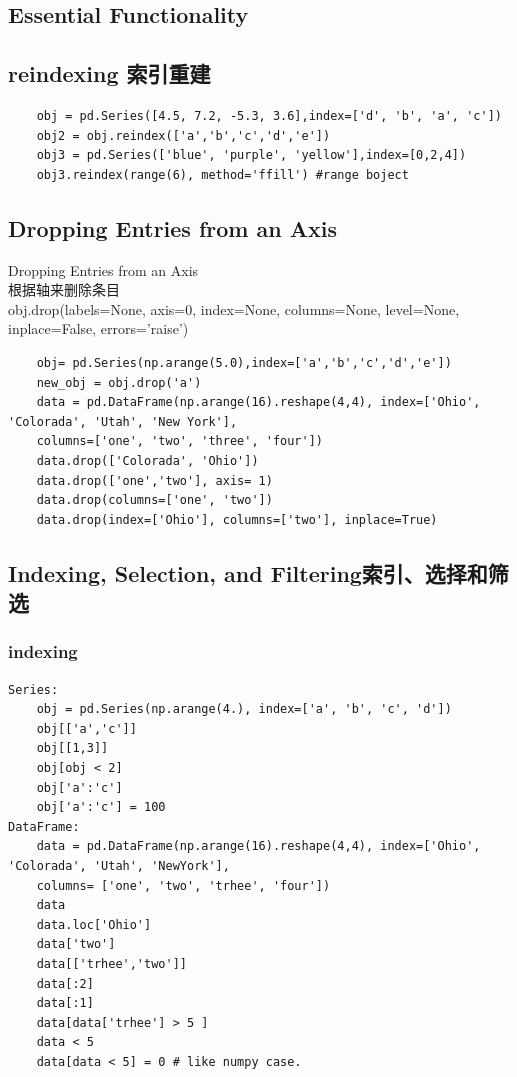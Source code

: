 \documentclass{article}
\begin{document}
\subsection{Essential Functionality}
\subsection{reindexing 索引重建}
\begin{lstlisting}
	obj = pd.Series([4.5, 7.2, -5.3, 3.6],index=['d', 'b', 'a', 'c'])
	obj2 = obj.reindex(['a','b','c','d','e'])
	obj3 = pd.Series(['blue', 'purple', 'yellow'],index=[0,2,4])
	obj3.reindex(range(6), method='ffill') #range boject	
\end{lstlisting}

\subsection{Dropping Entries from an Axis}
\noindent Dropping Entries from an Axis\\
根据轴来删除条目\\
obj.drop(labels=None, axis=0, index=None, columns=None, level=None,\\ inplace=False, errors='raise')\\
\begin{lstlisting}
	obj= pd.Series(np.arange(5.0),index=['a','b','c','d','e'])
	new_obj = obj.drop('a')
	data = pd.DataFrame(np.arange(16).reshape(4,4), index=['Ohio', 'Colorada', 'Utah', 'New York'],
	columns=['one', 'two', 'three', 'four'])
	data.drop(['Colorada', 'Ohio'])
	data.drop(['one','two'], axis= 1)
	data.drop(columns=['one', 'two'])
	data.drop(index=['Ohio'], columns=['two'], inplace=True)
\end{lstlisting}

\subsection{Indexing, Selection, and Filtering索引、选择和筛选}
\subsubsection{indexing}

\begin{lstlisting}
Series:
	obj = pd.Series(np.arange(4.), index=['a', 'b', 'c', 'd'])
	obj[['a','c']]
	obj[[1,3]]
	obj[obj < 2]
	obj['a':'c']
	obj['a':'c'] = 100
DataFrame:
	data = pd.DataFrame(np.arange(16).reshape(4,4), index=['Ohio', 'Colorada', 'Utah', 'NewYork'],
	columns= ['one', 'two', 'trhee', 'four'])
	data
	data.loc['Ohio']
	data['two']
	data[['trhee','two']]
	data[:2]
	data[:1]
	data[data['trhee'] > 5 ]
	data < 5
	data[data < 5] = 0 # like numpy case.
		
\end{lstlisting}
\end{document}

